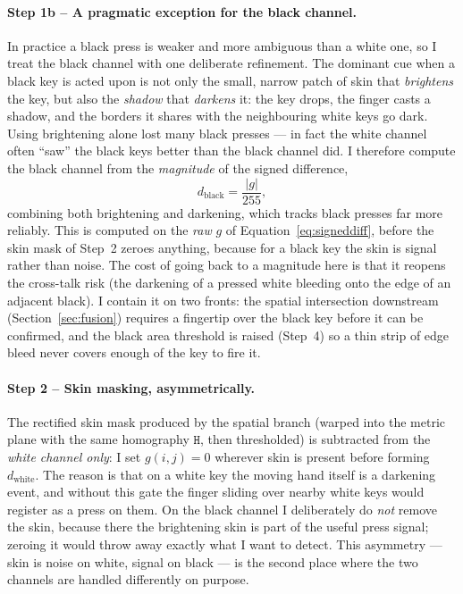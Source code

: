 \documentclass[11pt]{article}
\begin{document}
\paragraph{Step 1b -- A pragmatic exception for the black channel.}
In practice a black press is weaker and more ambiguous than a white one, so I
treat the black channel with one deliberate refinement. The dominant cue when a
black key is acted upon is not only the small, narrow patch of skin that
\emph{brightens} the key, but also the \emph{shadow} that \emph{darkens} it: the
key drops, the finger casts a shadow, and the borders it shares with the
neighbouring white keys go dark. Using brightening alone lost many black presses
--- in fact the white channel often ``saw'' the black keys better than the black
channel did. I therefore compute the black channel from the \emph{magnitude} of
the signed difference,
\begin{equation}
  d_{\text{black}} = \frac{\lvert g \rvert}{255},
\end{equation}
combining both brightening and darkening, which tracks black presses far more
reliably. This is computed on the \emph{raw} $g$ of Equation~\eqref{eq:signeddiff},
before the skin mask of Step~2 zeroes anything, because for a black key the skin
is signal rather than noise. The cost of going back to a magnitude here is that it
reopens the cross-talk risk (the darkening of a pressed white bleeding onto the
edge of an adjacent black). I contain it on two fronts: the spatial intersection
downstream (Section~\ref{sec:fusion}) requires a fingertip over the black key
before it can be confirmed, and the black area threshold is raised (Step~4) so a
thin strip of edge bleed never covers enough of the key to fire it.

\paragraph{Step 2 -- Skin masking, asymmetrically.}
The rectified skin mask produced by the spatial branch (warped into the metric
plane with the same homography $\mathtt{H}$, then thresholded) is subtracted from
the \emph{white channel only}: I set $g(i,j)=0$ wherever skin is present before
forming $d_{\text{white}}$. The reason is that on a white key the moving hand
itself is a darkening event, and without this gate the finger sliding over nearby
white keys would register as a press on them. On the black channel I deliberately
do \emph{not} remove the skin, because there the brightening skin is part of the
useful press signal; zeroing it would throw away exactly what I want to detect.
This asymmetry --- skin is noise on white, signal on black --- is the second place
where the two channels are handled differently on purpose.
\end{document}
